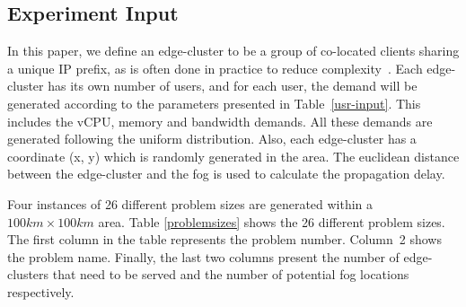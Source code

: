 \documentclass[10pt,journal,compsoc]{IEEEtran}
\begin{document}
\subsection{Experiment Input}
In this paper, we define an edge-cluster to be a group of co-located clients sharing a unique IP prefix, as is often done in practice to reduce complexity~\cite{nygren2010akamai}. Each edge-cluster has its own number of users, and for each user, the demand will be generated according to the parameters presented in Table~\ref{usr-input}. This includes the vCPU, memory and bandwidth demands. All these demands are generated following the uniform distribution. Also, each edge-cluster has a coordinate (x, y) which is randomly generated in the area. The euclidean distance between the edge-cluster and the fog is used to calculate the propagation delay.

\begin{table}[th]
\centering
\caption{Edge cluster demands}
\label{usr-input}
\end{table}

Four instances of 26 different problem sizes are generated within a $100 km \times 100 km$ area. Table \ref{problemsizes} shows the 26 different problem sizes. The first column in the table represents the problem number. Column~2 shows the problem name. Finally, the last two columns present the number of edge-clusters that need to be served and the number of potential fog locations respectively. 
\end{document}
